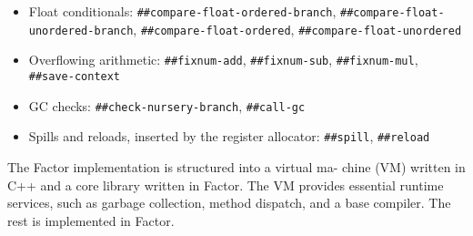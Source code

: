\begin{itemize}
\item
\begin{flushleft}
Float conditionals:
\Verb|##compare-float-ordered-branch|,
\Verb|##compare-float-unordered-branch|,
\Verb|##compare-float-ordered|,
\Verb|##compare-float-unordered|
\end{flushleft}

\item
\begin{flushleft}
Overflowing arithmetic:
\Verb|##fixnum-add|,
\Verb|##fixnum-sub|,
\Verb|##fixnum-mul|,
\Verb|##save-context|
\end{flushleft}

\item
\begin{flushleft}
\Gls{GC} checks:
\Verb|##check-nursery-branch|,
\Verb|##call-gc|
\end{flushleft}

\item
\begin{flushleft}
Spills and reloads, inserted by the register allocator:
\Verb|##spill|,
\Verb|##reload|
\end{flushleft}
\end{itemize}


The Factor implementation is structured into a virtual ma- chine (VM) written
in C++ and a core library written in Factor. The VM provides essential runtime
services, such as garbage collection, method dispatch, and a base compiler.
The rest is implemented in Factor.

